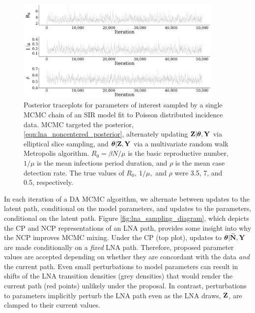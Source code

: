 \begin{figure}[!ht]
	\centering
	\includegraphics[width=0.9\textwidth]{figures/lna_noncentered_traces}
	\caption{Posterior traceplots for parameters of interest sampled by a single MCMC chain of an SIR model fit to Poisson distributed incidence data. MCMC targeted the posterior, \ref{eqn:lna_noncentered_posterior}, alternately updating $ \mathbf{Z}|\boldsymbol{\theta},\mathbf{Y} $ via elliptical slice sampling, and $ \boldsymbol{\theta}|\mathbf{Z},\mathbf{Y} $ via a multivariate random walk Metropolis algorithm. $ R_0 = \beta N / \mu$ is the basic reproductive number, $ 1/\mu $ is the mean infectious period duration, and $ \rho $ is the mean case detection rate. The true values of $ R_0,\ 1/\mu,$ and $ \rho $ were 3.5, 7, and 0.5, respectively.}
	\label{fig:lna_noncentered_traces}
\end{figure}

In each iteration of a DA MCMC algorithm, we alternate between updates to the latent path, conditional on the model parameters, and updates to the parameters, conditional on the latent path. Figure \ref{fig:lna_sampling_diagram}, which depicts the CP and NCP representations of an LNA path, provides some insight into why the NCP improves MCMC mixing. Under the CP (top plot), updates to $ \boldsymbol{\theta}|\widetilde{\mathbf{N}},\mathbf{Y} $ are made conditionally on a \textit{fixed} LNA path. Therefore, proposed parameter values are accepted depending on whether they are concordant with the data \textit{and} the current path. Even small perturbations to model parameters can result in shifts of the LNA transition densities (grey densities) that would render the current path (red points) unlikely under the proposal. In contrast, perturbations to parameters implicitly perturb the LNA path even as the LNA draws, $ \mathbf{Z} $, are clamped to their current values. 

